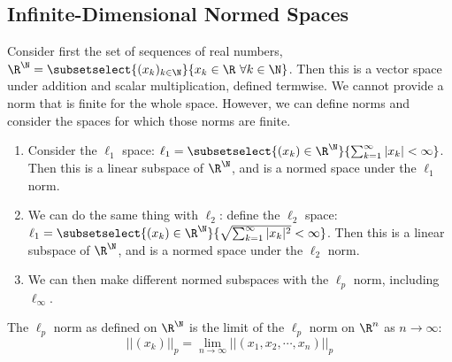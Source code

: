 \documentclass[../Main.tex]{subfiles}
\begin{document}
\subsection{Infinite-Dimensional Normed Spaces}
Consider first the set of sequences of real numbers, $\R^\N = \subsetselect{(x_k)_{k \in \N}}{x_k \in \R~\forall k \in \N}$. Then this is a vector space under addition and scalar multiplication, defined termwise. We cannot provide a norm that is finite for the whole space. However, we can define norms and consider the spaces for which those norms are finite.
\begin{enumerate}
    \item Consider the $\ell_1$ space: $\ell_1 = \subsetselect{(x_k) \in \R^\N}{\sum_{k=1}^\infty |x_k| < \infty}$. Then this is a linear subspace of $\R^\N$, and is a normed space under the $\ell_1$ norm.
    \item We can do the same thing with $\ell_2$: define the $\ell_2$ space: $\ell_1 = \subsetselect{(x_k) \in \R^\N}{\sqrt{\sum_{k=1}^\infty |x_k|^2} < \infty}$. Then this is a linear subspace of $\R^\N$, and is a normed space under the $\ell_2$ norm.
    \item We can then make different normed subspaces with the $\ell_p$ norm, including $\ell_\infty$.
\end{enumerate}
\begin{remark}
    The $\ell_p$ norm as defined on $\R^\N$ is the limit of the $\ell_p$ norm on $\R^n$ as $n \to\infty$:
    \begin{equation*}
        ||(x_k)||_p = \lim_{n \to \infty} ||(x_1, x_2, \cdots, x_n)||_p
    \end{equation*}
\end{remark}
\end{document}
